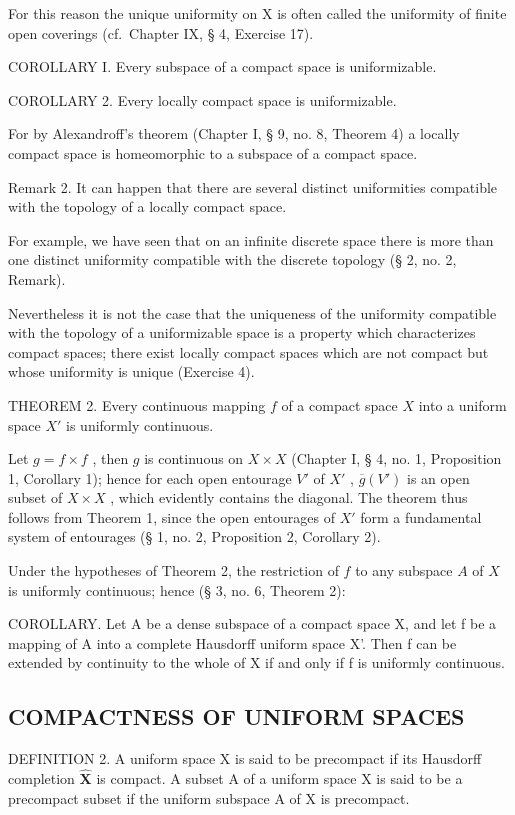For this reason the unique uniformity on X is often called the uniformity of finite open coverings (cf.~Chapter IX, § 4, Exercise 17).

COROLLARY I. Every subspace of a compact space is uniformizable.

COROLLARY 2. Every locally compact space is uniformizable.

For by Alexandroff's theorem (Chapter I, § 9, no. 8, Theorem 4) a locally compact space is homeomorphic to a subspace of a compact space.

Remark 2. It can happen that there are several distinct uniformities compatible with the topology of a locally compact space.

For example, we have seen that on an infinite discrete space there is more than one distinct uniformity compatible with the discrete topology (§ 2, no. 2, Remark).

Nevertheless it is not the case that the uniqueness of the uniformity compatible with the topology of a uniformizable space is a property which characterizes compact spaces; there exist locally compact spaces which are not compact but whose uniformity is unique (Exercise 4).

THEOREM 2. Every continuous mapping \(f\) of a compact space \(X\) into a uniform space \(X'\) is uniformly continuous.

Let \(g = f \times f\) , then \(g\) is continuous on \(X \times X\) (Chapter I, § 4, no. 1, Proposition 1, Corollary 1); hence for each open entourage \(V'\) of \(X'\) , \(\overline{g}(V')\) is an open subset of \(X \times X\) , which evidently contains the diagonal. The theorem thus follows from Theorem 1, since the open entourages of \(X'\) form a fundamental system of entourages (§ 1, no. 2, Proposition 2, Corollary 2).

Under the hypotheses of Theorem 2, the restriction of \(f\) to any subspace \(A\) of \(X\) is uniformly continuous; hence (§ 3, no. 6, Theorem 2):

COROLLARY. Let A be a dense subspace of a compact space X, and let f be a mapping of A into a complete Hausdorff uniform space X'. Then f can be extended by continuity to the whole of X if and only if f is uniformly continuous.

\subsection{COMPACTNESS OF UNIFORM SPACES}

DEFINITION 2. A uniform space X is said to be precompact if its Hausdorff completion \(\hat{\mathbf{X}}\) is compact. A subset A of a uniform space X is said to be a precompact subset if the uniform subspace A of X is precompact.


